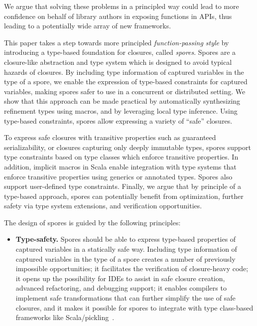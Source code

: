 \documentclass[runningheads]{llncs}
\begin{document}
\begin{sloppypar}
We argue that solving these problems in a principled way could lead to more
confidence on behalf of library authors in exposing functions in APIs, thus
leading to a potentially wide array of new frameworks.

This paper takes a step towards more principled {\em function-passing style}
by introducing a type-based foundation for closures, called {\em spores}.
Spores are a closure-like abstraction and type system which is designed to
avoid typical hazards of closures. By including type information of captured
variables in the type of a spore, we enable the expression of type-based
constraints for captured variables, making spores safer to use in a concurrent
or distributed setting. We show that this approach can be made practical by
automatically synthesizing refinement types using macros, and by leveraging
local type inference. Using type-based constraints, spores allow expressing a
variety of ``safe'' closures.

To express safe closures with transitive properties such as guaranteed
serializability, or closures capturing only deeply immutable types, spores
support type constraints based on type classes which enforce transitive properties.
In addition, implicit macros in Scala enable integration with type systems that
enforce transitive properties using generics or annotated types. Spores also
support user-defined type constraints. Finally, we argue that by principle
of a type-based approach, spores can potentially benefit from optimization, further
safety via type system extensions, and verification opportunities.

The design of spores is guided by the following principles:

\begin{itemize}
\item {\bf Type-safety.} Spores should be able to express type-based
properties of captured variables in a statically safe way. Including type
information of captured variables in the type of a spore creates a number of
previously impossible opportunities; it facilitates the verification of
closure-heavy code; it opens up the possibility for IDEs to assist in safe
closure creation, advanced refactoring, and debugging support; it enables
compilers to implement safe transformations that can further simplify the use
of safe closures, and it makes it possible for spores to integrate with type
class-based frameworks like Scala/pickling~\cite{ScalaPickling}.


\end{itemize}
\end{sloppypar}
\end{document}
